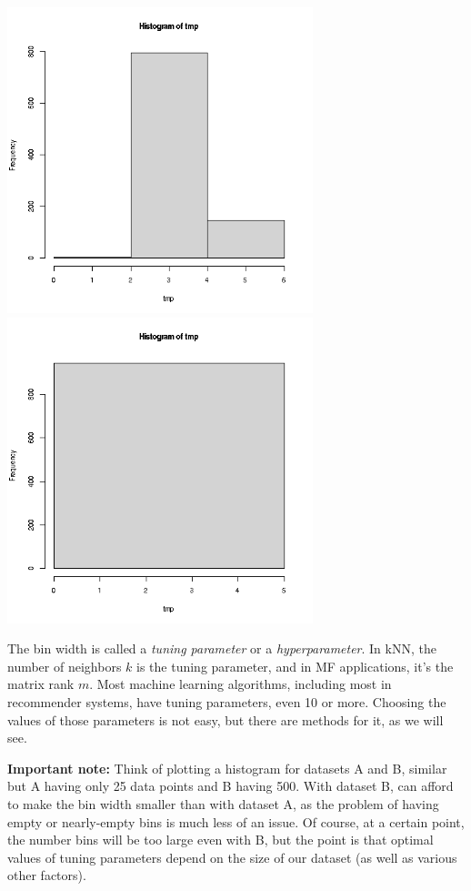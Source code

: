 \begin{itemize}
\includegraphics[width=3.5in]{Images/HistBrks2.png} 
\includegraphics[width=3.5in]{Images/HistBrks1.png} 

\end{itemize} 

The bin width is called a \textit{tuning parameter} or a
\textit{hyperparameter}.  In kNN, the number of neighbors $k$ is the
tuning parameter, and in MF applications, it's the matrix rank $m$.
Most machine learning algorithms, including most in recommender systems,
have tuning parameters, even 10 or more.  Choosing the values of those
parameters is not easy, but there are methods for it, as we will see.

\textbf{Important note:} Think of plotting a histogram for datasets A
and B, similar but A having only 25 data points and B having 500.  With
dataset B, can afford to make the bin width smaller than with dataset A,
as the problem of having empty or nearly-empty bins is much less of an
issue.  Of course, at a certain point, the number bins will be too large
even with B, but the point is that optimal values of tuning parameters
depend on the size of our dataset (as well as various other factors).


